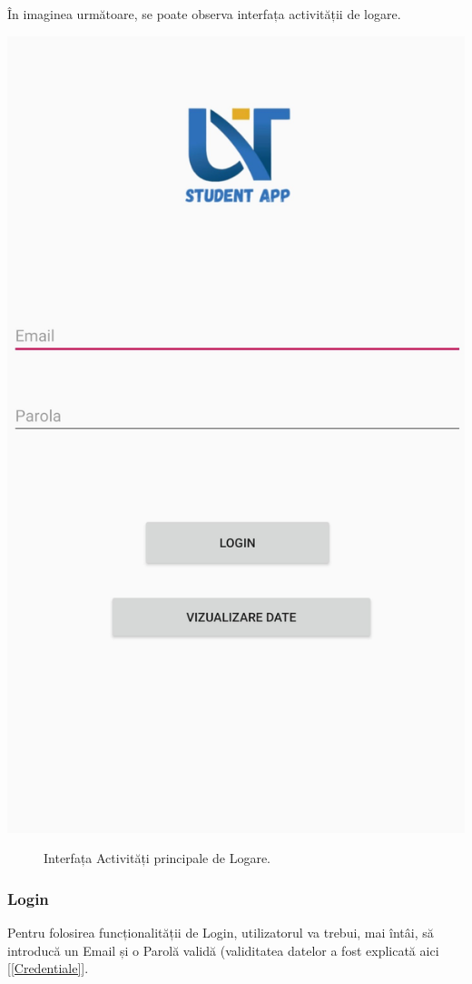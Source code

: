 \documentclass{article}
\begin{document}
		În imaginea următoare, se poate observa interfața activității de logare.

	\begin{center}
		\includegraphics[scale=0.15]{Source/UVTMain}
		\begin{figure}[!h]
			{\caption*{Interfața Activități principale de Logare.}}
		\end{figure}
	\end{center}

		\subsubsection*{Login}
		Pentru folosirea funcționalității de Login, utilizatorul va trebui, mai întâi, să introducă un Email și o Parolă validă (validitatea datelor a fost explicată aici [\ref{Credentiale}].
\end{document}
